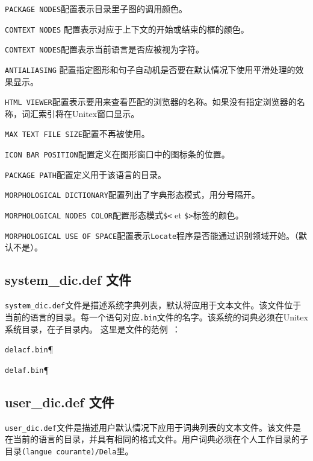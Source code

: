 \bigskip
\noindent 
\verb+PACKAGE NODES+配置表示目录里子图的调用颜色。

\bigskip
\noindent 
 \verb+CONTEXT NODES+ 配置表示对应于上下文的开始或结束的框的颜色。


\bigskip
\noindent
\verb+CONTEXT NODES+配置表示当前语言是否应被视为字符。

\bigskip
\noindent
\verb+ANTIALIASING+ 配置指定图形和句子自动机是否要在默认情况下使用平滑处理的效果显示。



\bigskip
\noindent
\verb+HTML VIEWER+配置表示要用来查看匹配的浏览器的名称。如果没有指定浏览器的名称，词汇索引将在Unitex窗口显示。

\bigskip
\noindent
\verb+MAX TEXT FILE SIZE+配置不再被使用。


\bigskip
\noindent 
\verb+ICON BAR POSITION+配置定义在图形窗口中的图标条的位置。

\bigskip
\noindent 
\verb+PACKAGE PATH+配置定义用于该语言的目录。


\bigskip
\noindent
 \verb+MORPHOLOGICAL DICTIONARY+配置列出了字典形态模式，用分号隔开。


\bigskip
\noindent
\verb+MORPHOLOGICAL NODES COLOR+配置形态模式\verb+$<+ et \verb+$>+标签的颜色。



\bigskip
\noindent 
\verb+MORPHOLOGICAL USE OF SPACE+配置表示\verb+Locate+程序是否能通过识别领域开始。（默认不是）。

\subsection{ system\_dic.def 文件}
 \verb+system_dic.def+文件是描述系统字典列表，默认将应用于文本文件。该文件位于当前的语言的目录。每一个语句对应\verb+.bin+文件的名字。该系统的词典必须在Unitex系统目录，在子目录内。
 这里是文件的范例~：

\bigskip
\verb$delacf.bin$\P

\verb$delaf.bin$\P

\subsection{ user\_dic.def 文件}
\verb+user_dic.def+文件是描述用户默认情况下应用于词典列表的文本文件。该文件是在当前的语言的目录，并具有相同的格式文件。用户词典必须在个人工作目录的子目录\verb+(langue courante)/Dela+里。


